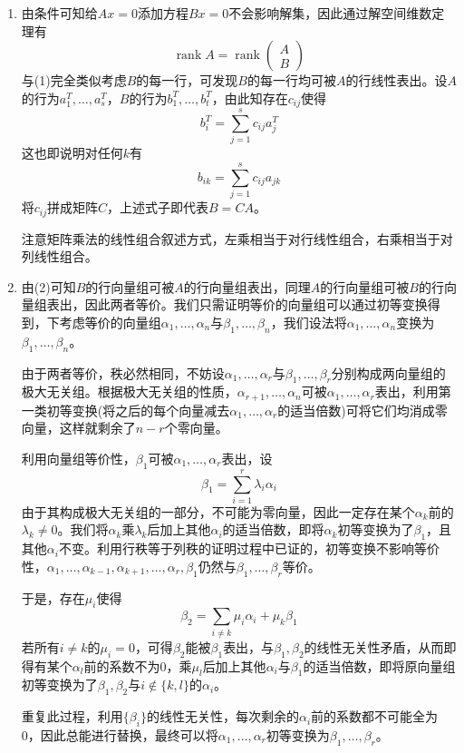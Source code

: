 \documentclass[a4paper,UTF8,fontset=windows]{ctexart}
\DeclareMathOperator{\rank}{rank}
\newcommand*{\note}{\noindent *}
\begin{document}
\begin{enumerate}
\begin{enumerate}[(1)]
        \item 由条件可知给$Ax=0$添加方程$Bx=0$不会影响解集，因此通过解空间维数定理有
        $$\rank A=\rank\begin{pmatrix}A\\B\end{pmatrix}$$
        与(1)完全类似考虑$B$的每一行，可发现$B$的每一行均可被$A$的行线性表出。设$A$的行为$a_1^T,\dots,a_s^T$，$B$的行为$b_1^T,\dots,b_t^T$，由此知存在$c_{ij}$使得
        $$b_i^T=\sum_{j=1}^sc_{ij}a_j^T$$
        这也即说明对任何$k$有
        $$b_{ik}=\sum_{j=1}^sc_{ij}a_{jk}$$
        将$c_{ij}$拼成矩阵$C$，上述式子即代表$B=CA$。

        \note 注意矩阵乘法的线性组合叙述方式，左乘相当于对行线性组合，右乘相当于对列线性组合。

        \item 由(2)可知$B$的行向量组可被$A$的行向量组表出，同理$A$的行向量组可被$B$的行向量组表出，因此两者等价。我们只需证明等价的向量组可以通过初等变换得到，下考虑等价的向量组$\alpha_1,\dots,\alpha_n$与$\beta_1,\dots,\beta_n$，我们设法将$\alpha_1,\dots,\alpha_n$变换为$\beta_1,\dots,\beta_n$。
        
        由于两者等价，秩必然相同，不妨设$\alpha_1,\dots,\alpha_r$与$\beta_1,\dots,\beta_r$分别构成两向量组的极大无关组。根据极大无关组的性质，$\alpha_{r+1},\dots,\alpha_n$可被$\alpha_1,\dots,\alpha_r$表出，利用第一类初等变换(将之后的每个向量减去$\alpha_1,\dots,\alpha_r$的适当倍数)可将它们均消成零向量，这样就剩余了$n-r$个零向量。

        利用向量组等价性，$\beta_1$可被$\alpha_1,\dots,\alpha_r$表出，设
        $$\beta_1=\sum_{i=1}^r\lambda_i\alpha_i$$
        由于其构成极大无关组的一部分，不可能为零向量，因此一定存在某个$\alpha_k$前的$\lambda_k\ne0$。我们将$\alpha_k$乘$\lambda_k$后加上其他$\alpha_i$的适当倍数，即将$\alpha_k$初等变换为了$\beta_1$，且其他$\alpha_i$不变。利用行秩等于列秩的证明过程中已证的，初等变换不影响等价性，$\alpha_1,\dots,\alpha_{k-1},\alpha_{k+1},\dots,\alpha_r,\beta_1$仍然与$\beta_1,\dots,\beta_r$等价。

        于是，存在$\mu_i$使得
        $$\beta_2=\sum_{i\ne k}\mu_i\alpha_i+\mu_k\beta_1$$
        若所有$i\ne k$的$\mu_i=0$，可得$\beta_2$能被$\beta_1$表出，与$\beta_1,\beta_2$的线性无关性矛盾，从而即得有某个$\alpha_l$前的系数不为0，乘$\mu_l$后加上其他$\alpha_i$与$\beta_1$的适当倍数，即将原向量组初等变换为了$\beta_1,\beta_2$与$i\notin\{k,l\}$的$\alpha_i$。

        重复此过程，利用$\{\beta_i\}$的线性无关性，每次剩余的$\alpha_i$前的系数都不可能全为0，因此总能进行替换，最终可以将$\alpha_1,\dots,\alpha_r$初等变换为$\beta_1,\dots,\beta_r$。


\end{enumerate}
\end{enumerate}
\end{document}
